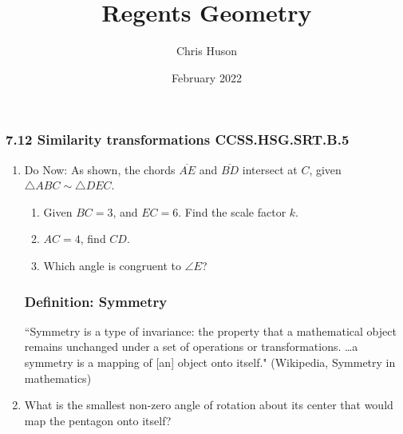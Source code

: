 \documentclass[12pt, twoside]{article}
\title{Regents Geometry}
\author{Chris Huson}
\date{February 2022}
\begin{document}
\subsubsection*{7.12 Similarity transformations \hfill CCSS.HSG.SRT.B.5}
\begin{enumerate}
\item Do Now: As shown, the chords $\overline{AE}$ and $\overline{BD}$ intersect at $C$, given $\triangle ABC \sim \triangle DEC$.
\begin{multicols}{2}
  \begin{enumerate}
    \item Given $BC=3$, and $EC=6$. Find the scale factor $k$.
    \item $AC=4$, find $CD$.
    \item Which angle is congruent to $\angle E$? \vspace{1cm}
  \end{enumerate}
  \begin{flushright}
  \end{flushright}
\end{multicols}

\subsubsection*{Definition: Symmetry}
``Symmetry is a type of invariance: the property that a mathematical object remains unchanged under a set of operations or transformations.
\dots a symmetry is a mapping of [an] object onto itself." (Wikipedia, Symmetry in mathematics) \vspace{0.5cm}

\item What is the smallest non-zero angle of rotation about its center that would map the pentagon onto itself? %
 \begin{center}
   \end{center}


\end{enumerate}
\end{document}
